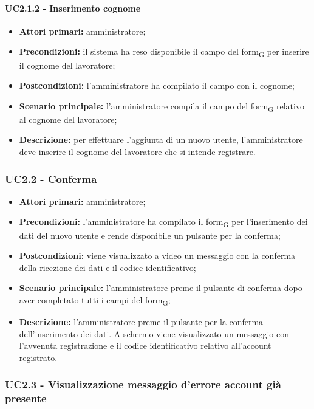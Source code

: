 \paragraph{UC2.1.2 - Inserimento cognome}

\begin{itemize}
	\item 	\textbf{Attori primari:} amministratore;
	\item 	\textbf{Precondizioni:} il sistema ha reso disponibile il campo del form\textsubscript{G} per inserire il cognome del lavoratore;
	\item 	\textbf{Postcondizioni:} l'amministratore ha compilato il campo con il cognome;
	\item 	\textbf{Scenario principale:} l'amministratore compila il campo del form\textsubscript{G} relativo al cognome del lavoratore;
	\item 	\textbf{Descrizione:} per effettuare l'aggiunta di un nuovo utente, l'amministratore deve inserire il cognome del lavoratore che si intende registrare.
	
\end{itemize}

\subsubsection{UC2.2 - Conferma}

\begin{itemize}
	\item 	\textbf{Attori primari:} amministratore;
	\item 	\textbf{Precondizioni:} l'amministratore ha compilato il form\textsubscript{G} per l'inserimento dei dati del nuovo utente e rende disponibile un pulsante per la conferma;
	\item 	\textbf{Postcondizioni:} viene visualizzato a video un messaggio con la conferma della ricezione dei dati e il codice identificativo;
	\item 	\textbf{Scenario principale:} l'amministratore preme il pulsante di conferma dopo aver completato tutti i campi del form\textsubscript{G};
	\item 	\textbf{Descrizione:} l'amministratore preme il pulsante per la conferma dell'inserimento dei dati. A schermo viene visualizzato un messaggio con l'avvenuta registrazione e il codice identificativo relativo all'account registrato.

\end{itemize}

\subsubsection{UC2.3 - Visualizzazione messaggio d'errore account già presente}

